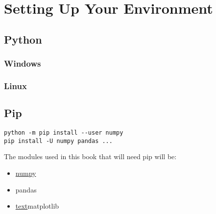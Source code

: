 \chapter{Setting Up Your Environment}
\section{Python}
\subsection{Windows}
\subsection{Linux}

\section{Pip}

\begin{verbatim}
python -m pip install --user numpy
pip install -U numpy pandas ...
\end{verbatim}

The modules used in this book that will need pip will be:
\begin{multicols}{3}
	\begin{itemize}[label={}]
		\item \hyperref[ch:NumPy]{numpy}
		\item pandas
		\item \hyperref[ch:MatPlotLib]{text}matplotlib
	\end{itemize}
\end{multicols}

